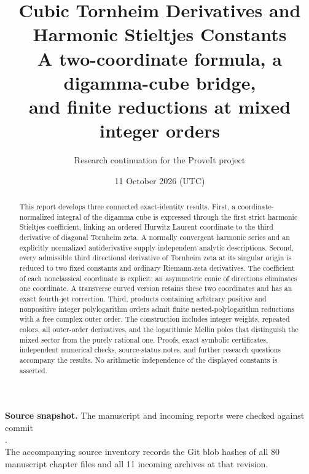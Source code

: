 \documentclass[11pt]{article}
\title{\color{ResearchBlue}\bfseries Cubic Tornheim Derivatives and\\Harmonic Stieltjes Constants\\[6pt]\large A two-coordinate formula, a digamma-cube bridge,\\and finite reductions at mixed integer orders}
\author{Research continuation for the ProveIt project}
\date{11 October 2026 (UTC)}
\begin{document}
\maketitle
\thispagestyle{empty}
\begin{abstract}
This report develops three connected exact-identity results. First, a
coordinate-normalized integral of the digamma cube is expressed through the
first strict harmonic Stieltjes coefficient, linking an ordered Hurwitz
Laurent coordinate to the third derivative of diagonal Tornheim zeta.
A normally convergent harmonic series and an explicitly normalized
antiderivative supply independent analytic descriptions. Second, every
admissible third directional derivative of Tornheim zeta at its singular
origin is reduced to two fixed constants and ordinary Riemann-zeta
derivatives. The coefficient of each nonclassical coordinate is explicit;
an asymmetric conic of directions eliminates one coordinate. A transverse
curved version retains these two coordinates and has an exact fourth-jet
correction. Third, products containing arbitrary positive and nonpositive
integer polylogarithm orders admit finite nested-polylogarithm reductions
with a free complex outer order. The construction includes integer
weights, repeated colors, all outer-order derivatives, and the logarithmic
Mellin poles that distinguish the mixed sector from the purely rational
one. Proofs, exact symbolic certificates, independent numerical checks,
source-status notes, and further research questions accompany the results.
No arithmetic independence of the displayed constants is asserted.
\end{abstract}
\vfill
\noindent\textbf{Source snapshot.} The manuscript and incoming reports were
checked against commit\\[3pt]
\sourcecommit.\\[5pt]
The accompanying source inventory records the Git blob hashes of all
80 manuscript chapter files and all 11 incoming archives at that revision.
\clearpage
\tableofcontents
\clearpage








\end{document}
